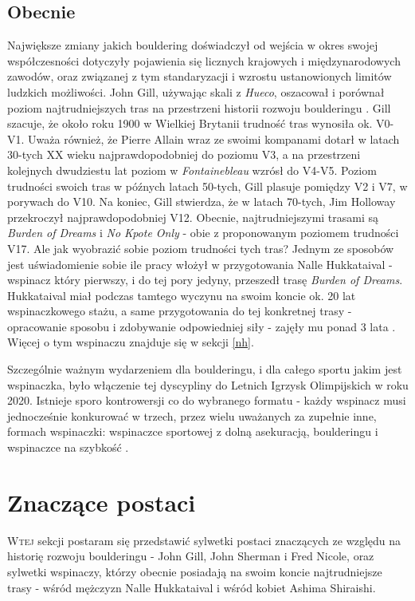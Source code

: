 \documentclass{article}
\begin{document}
\subsection{Obecnie}
Największe zmiany jakich bouldering doświadczył od wejścia w okres swojej współczesności dotyczyły pojawienia się licznych krajowych i międzynarodowych zawodów, oraz związanej z tym standaryzacji i wzrostu ustanowionych limitów ludzkich możliwości. John Gill, używając skali z \textit{Hueco}, oszacował i porównał poziom najtrudniejszych tras na przestrzeni historii rozwoju boulderingu \cite{gill-history}. Gill szacuje, że około roku 1900 w Wielkiej Brytanii trudność tras wynosiła ok. V0-V1. Uważa również, że Pierre Allain wraz ze swoimi kompanami dotarł w latach 30-tych XX wieku najprawdopodobniej do poziomu V3, a na przestrzeni kolejnych dwudziestu lat poziom w \textit{Fontainebleau} wzrósł do V4-V5. Poziom trudności swoich tras w późnych latach 50-tych, Gill plasuje pomiędzy V2 i V7, w porywach do V10. Na koniec, Gill stwierdza, że w latach 70-tych, Jim Holloway przekroczył najprawdopodobniej V12. Obecnie, najtrudniejszymi trasami są \textit{Burden of Dreams} i \textit{No Kpote Only} - obie z proponowanym poziomem trudności V17. Ale jak wyobrazić sobie poziom trudności tych tras? Jednym ze sposobów jest uświadomienie sobie ile pracy włożył w przygotowania Nalle Hukkataival - wspinacz który pierwszy, i do tej pory jedyny, przeszedł trasę \textit{Burden of Dreams}. Hukkataival miał podczas tamtego wyczynu na swoim koncie ok. 20 lat wspinaczkowego stażu, a same przygotowania do tej konkretnej trasy - opracowanie sposobu i zdobywanie odpowiedniej siły - zajęły mu ponad 3 lata \cite{hukkataival-yt}. Więcej o tym wspinaczu znajduje się w sekcji \ref{nh}. 

Szczególnie ważnym wydarzeniem dla boulderingu, i dla całego sportu jakim jest wspinaczka, było włączenie tej dyscypliny do Letnich Igrzysk Olimpijskich w roku 2020. Istnieje sporo kontrowersji co do wybranego formatu - każdy wspinacz musi jednocześnie konkurować w trzech, przez wielu uważanych za zupełnie inne, formach wspinaczki: wspinaczce sportowej z dolną asekuracją, boulderingu i wspinaczce na szybkość \cite{olympics}. 


\section{Znaczące postaci}
\lettrine[lines=2]{W}{tej} sekcji postaram się przedstawić sylwetki postaci znaczących ze względu na historię rozwoju boulderingu - John Gill, John Sherman i Fred Nicole, oraz sylwetki wspinaczy, którzy obecnie posiadają na swoim koncie najtrudniejsze trasy - wśród mężczyzn Nalle Hukkataival i wśród kobiet Ashima Shiraishi. 
\end{document}
